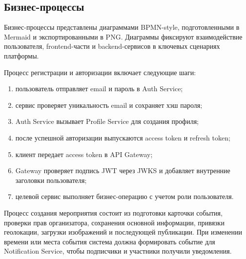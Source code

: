 
\subsection{Бизнес-процессы}

Бизнес-процессы представлены диаграммами BPMN-style, подготовленными в Mermaid и экспортированными в PNG. Диаграммы фиксируют взаимодействие пользователя, frontend-части и backend-сервисов в ключевых сценариях платформы.


Процесс регистрации и авторизации включает следующие шаги:
\begin{enumerate}
    \item пользователь отправляет email и пароль в Auth Service;
    \item сервис проверяет уникальность email и сохраняет хэш пароля;
    \item Auth Service вызывает Profile Service для создания профиля;
    \item после успешной авторизации выпускаются access token и refresh token;
    \item клиент передает access token в API Gateway;
    \item Gateway проверяет подпись JWT через JWKS и добавляет внутренние заголовки пользователя;
    \item целевой сервис выполняет бизнес-операцию с учетом роли пользователя.
\end{enumerate}


Процесс создания мероприятия состоит из подготовки карточки события, проверки прав организатора, сохранения основной информации, привязки геолокации, загрузки изображений и последующей публикации. При изменении времени или места события система должна формировать событие для Notification Service, чтобы подписчики и участники получили уведомления.




